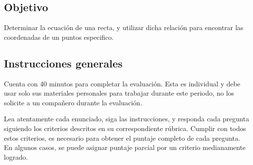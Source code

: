 \documentclass[]{srs2}
\begin{document}
\subsection*{Objetivo}
  Determinar la ecuación de una recta, y utilizar dicha relación para
  encontrar las coordenadas de un puntos especifico.

\subsection*{Instrucciones generales}
  Cuenta con 40 minutos para completar la evaluación. Esta es individual y debe usar solo
  sus materiales personales para trabajar durante este periodo, no los solicite a un compañero
  durante la evaluación.

  Lea atentamente cada enunciado, siga las instrucciones, y responda cada
  pregunta siguiendo los criterios descritos en su correspondiente rúbrica. Cumplir
  con todos estos criterios, es necesario para obtener el puntaje completo de cada pregunta.
  En algunos casos, se puede asignar puntaje parcial por un criterio medianamente logrado.

\separador[2mm]
\end{document}
